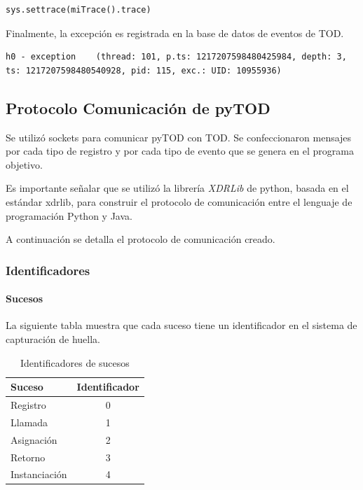 \documentclass[12pt,legalpaper]{report}
\begin{document}
\begin{itemize}
\begin{singlespace}
\begin{lstlisting}[style=Python]
sys.settrace(miTrace().trace)
\end{lstlisting}
\end{singlespace}	
\end{itemize}		

Finalmente, la excepción es registrada en la base de datos de eventos de TOD.

\begin{singlespace}
\begin{lstlisting}[style=consola,numbers=none]
h0 - exception    (thread: 101, p.ts: 1217207598480425984, depth: 3, ts: 1217207598480540928, pid: 115, exc.: UID: 10955936)
\end{lstlisting}
\end{singlespace}	

		\subsection{Protocolo Comunicación de pyTOD}

Se utilizó sockets para comunicar pyTOD con TOD.  Se confeccionaron mensajes por cada tipo de registro y por cada tipo de evento que se genera en el programa objetivo.

Es importante señalar que se utilizó la librería \textit{XDRLib} \cite{xdrlib} de python, basada en el estándar xdrlib\cite{xdrlibestandar}, para construir el protocolo de comunicación entre el lenguaje de programación Python y Java.

A continuación se detalla el protocolo de comunicación creado.

			\subsubsection{Identificadores}

				\paragraph{Sucesos}

La siguiente tabla muestra que cada suceso tiene un identificador en el sistema de capturación de huella.
\begin{table}[!h]
\begin{center}
\begin{tabular}{|l | c |}
\hline
\rowcolor[gray]{0.9}Suceso & Identificador\\
\hline
Registro & 0\\
\hline
Llamada & 1\\
\hline
Asignación & 2\\
\hline
Retorno & 3\\
\hline
Instanciación & 4\\
\hline
\end{tabular}
\caption{Identificadores de sucesos} 
\end{center}
\end{table}
\end{document}
